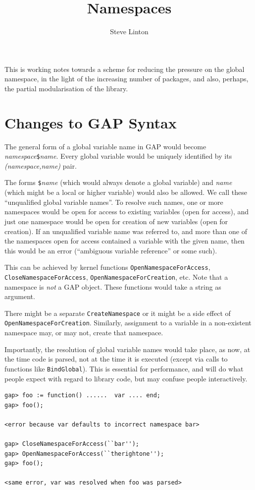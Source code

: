 \documentclass{article}
\title{Namespaces}
\author{Steve Linton}
\begin{document}
\maketitle

This is working notes towards a scheme for reducing the pressure on
the global namespace, in the light of the increasing number of
packages, and also, perhaps, the partial modularisation of the
library.

\section{Changes to GAP Syntax}

The general form of a  global variable name in GAP would become
\textit{namespace\/}\verb|$|\textit{name}. Every global variable would
be uniquely identified by its \textit{(namespace,name)} pair.

The forms \verb|$|\textit{name} (which would always denote a global
variable) and \textit{name} (which might be a local or higher
variable) would also be allowed. We call these ``unqualified global
variable names''.  To resolve such names, one or more namespaces would
be open for access to existing variables (open for access), and just one namespace would
be open for creation of new variables (open for creation). If an
unqualified variable name was referred to, and more than one of the
namespaces open for access contained a variable with the given name,
then this would be an error (``ambiguous variable reference'' or some
such).

This can be achieved by kernel functions
\verb|OpenNamespaceForAccess|, \verb|CloseNamespaceForAccess|,
\verb|OpenNamespaceForCreation|, etc. Note that a namespace is
\emph{not} a GAP object. These functions would take a string as
argument. 

There might be a separate \verb|CreateNamespace| or it might be a side
effect of \verb|OpenNamespaceForCreation|. Similarly, assignment to a
variable in a non-existent namespace may, or may not, create that namespace.

Importantly, the resolution of global variable names would take place,
as now, at the time code is parsed, not at the time it is executed
(except via calls to functions like \verb|BindGlobal|). This is
essential for performance, and will do what people expect with regard
to library code, but may confuse people interactively.

\begin{verbatim}
gap> foo := function() ......  var .... end;
gap> foo();

<error because var defaults to incorrect namespace bar>

gap> CloseNamespaceForAccess(``bar'');
gap> OpenNamespaceForAccess(``therightone'');
gap> foo();

<same error, var was resolved when foo was parsed>
\end{verbatim}
\end{document}
